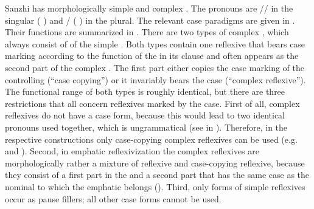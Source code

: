 Sanzhi has morphologically simple and complex . The pronouns are \slash{}\slash{} in the singular ( ) and \slash{} ( ) in the plural. The relevant case paradigms are given in . Their functions are summarized in . There are two types of complex , which always consist of  of the simple . Both types contain one reflexive that bears case marking according to the function of the  in its clause and often appears as the second part of the complex . The first part either copies the case marking of the controlling  (``case copying'') or it invariably bears the  case (``complex  reflexive''). The functional range of both types is roughly identical, but there are three restrictions that all concern reflexives marked by the  case. First of all, complex  reflexives do not have a  case form, because this would lead to two identical pronouns used together, which is ungrammatical (see  in ). Therefore, in the respective constructions only case-copying complex reflexives can be used (e.g.  and ). Second, in emphatic reflexivization the complex reflexives are morphologically rather a mixture of  reflexive and case-copying reflexive, because they consist of a first part in the  and a second part that has the same case as the nominal to which the emphatic belongs (). Third, only  forms of simple reflexives occur as pause fillers; all other case forms cannot be used.
%
